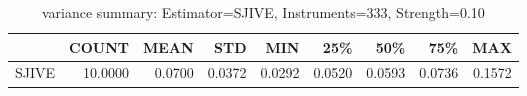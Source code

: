 \begin{table}[ht]
\centering
\caption{variance summary: Estimator=SJIVE, Instruments=333, Strength=0.10}
\begin{tabular}{lrrrrrrrr}
\toprule
 & COUNT & MEAN & STD & MIN & 25\% & 50\% & 75\% & MAX \\
\midrule
SJIVE & 10.0000 & 0.0700 & 0.0372 & 0.0292 & 0.0520 & 0.0593 & 0.0736 & 0.1572 \\
\bottomrule
\end{tabular}
\end{table}

